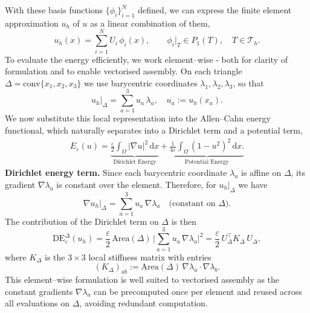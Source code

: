 \noindent With these basis functions $\{\phi_i\}_{i=1}^N$ defined, we can express the finite element approximation $u_h$ of $u$ as a linear combination of them,
\[
u_{h}(x) = \sum_{i=1}^{N} U_{i} \, \phi_{i}(x), \qquad \phi_{i}|_{T} \in P_{1}(T), \quad T \in \mathcal{T}_{h}.
\]
\noindent To evaluate the energy efficiently, we work element--wise - both for clarity of formulation and to enable vectorised assembly. On each triangle \(\Delta = \mathrm{conv}\{x_{1},x_{2},x_{3}\}\) we use barycentric coordinates \(\lambda_{1},\lambda_{2},\lambda_{3}\), so that
\[
u_{h}|_{\Delta} = \sum_{a=1}^{3} u_{a} \, \lambda_{a}, \quad u_{a} := u_{h}(x_{a}).
\]
\noindent We now substitute this local representation into the Allen–Cahn energy functional, which naturally separates into a Dirichlet term and a potential term,
\begin{align*}
    E_{\varepsilon}(u) = \underbrace{\frac{\varepsilon}{2} \int_{\Omega} |\nabla u|^{2}\,\mathrm{d}x}_{\text{Dirichlet Energy}} +  \underbrace{\frac{1}{4 \varepsilon} \int_{\Omega} (1-u^2)^2 \,\mathrm{d}x.}_{\text{Potential Energy}}
\end{align*}
\textbf{Dirichlet energy term.}
Since each barycentric coordinate \(\lambda_a\) is affine on \(\Delta\), its gradient \(\nabla \lambda_a\) is constant over the element. Therefore, for $u_h|_{\Delta}$ we have
\[
\nabla u_{h}|_{\Delta} = \sum_{a=1}^{3} u_{a} \, \nabla\lambda_{a} \quad \text{(constant on $\Delta$)}.
\]
The contribution of the Dirichlet term on \(\Delta\) is then
\[
\mathrm{DE}_{\varepsilon}^{\Delta}(u_{h})
= \frac{\varepsilon}{2} \, \mathrm{Area}(\Delta) \, \Big|\sum_{a=1}^{3} u_{a} \, \nabla\lambda_{a}\Big|^{2}
= \frac{\varepsilon}{2} \, U_{\Delta}^{\top} K_{\Delta} \, U_{\Delta},
\]
where $K_{\Delta}$ is the $3\times 3$ local stiffness matrix with entries
\[
(K_{\Delta})_{ab} := \mathrm{Area}(\Delta) \, \nabla\lambda_{a} \cdot \nabla\lambda_{b}.
\]
This element–wise formulation is well suited to vectorised assembly as the constant gradients \(\nabla \lambda_a\) can be precomputed once per element 
and reused across all evaluations on \(\Delta\), avoiding redundant computation.

